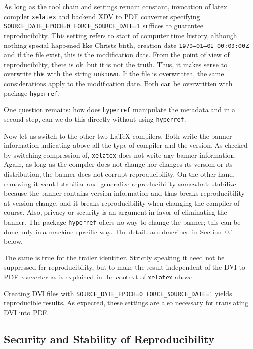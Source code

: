 \documentclass[a4paper, english]{article}%
\newcommand{\xelatex}{\texttt{xelatex}}
\begin{document}
As long as the tool chain and settings remain constant, 
invocation of latex compiler \xelatex{} and backend XDV to PDF converter 
specifying \texttt{SOURCE\_DATE\_EPOCH=0 FORCE\_SOURCE\_DATE=1} 
suffices to guarantee reproducibility. 
This setting refers to start of computer time history, 
although nothing special happened like Christs birth,
creation date \texttt{1970--01--01 00:00:00Z} 
and if the file exist, this is the modification date. 
From the point of view of reproducibility, 
there is ok, but it is not the truth. 
Thus, it makes sense to overwrite this with the string \texttt{unknown}. 
If the file is overwritten, the same considerations apply to the modification date. 
Both can be overwritten with package \texttt{hyperref}. 

One question remains: how does \texttt{hyperref} manipulate the metadata 
and in a second step, can we do this directly without using \texttt{hyperref}. 
\medskip


Now let us switch to the other two \LaTeX{} compilers. 
Both write the banner information indicating 
above all the type of compiler and the version. 
As checked by switching compression of, \xelatex{} does not write any banner information. 
Again, as long as the compiler does not change nor changes its version or its distribution, 
the banner does not corrupt reproducibility. 
On the other hand, removing it would stabilize and generalize reproducibility somewhat: 
stabilize because the banner contains version information 
and thus breaks reproducibility at version change, 
and it breaks reproducibility when changing the compiler of course. 
Also, privacy or security is an argument in favor of eliminating the banner. 
The package \texttt{hyperref} offers no way to change the banner; 
this can be done only in a machine specific way. 
The details are described in Section~\ref{subsec:securityRep} below. 

The same is true for the trailer identifier. 
Strictly speaking it need not be suppressed for reproducibility, 
but to make the result independent of the DVI to PDF converter 
as is explained in the context of \xelatex{} above. 

Creating DVI files with \texttt{SOURCE\_DATE\_EPOCH=0 FORCE\_SOURCE\_DATE=1} 
yields reproducible results. 
As expected, these settings are also necessary for translating DVI into PDF\@. 





\subsection{Security and Stability of Reproducibility}\label{subsec:securityRep}
\end{document}
